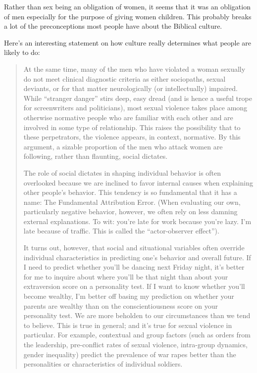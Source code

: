 \documentclass[11pt]{article}
\begin{document}
Rather than sex being an obligation of women, it seems that it was an obligation of men especially for the purpose of giving women children. This probably breaks a lot of the preconceptions most people have about the Biblical culture.

Here’s an interesting statement on how culture really determines what people are likely to do:
\begin{quote}
At the same time, many of the men who have violated a woman sexually do not meet clinical diagnostic criteria as either sociopaths, sexual deviants, or for that matter neurologically (or intellectually) impaired. While “stranger danger” stirs deep, easy dread (and is hence a useful trope for screenwriters and politicians), most sexual violence takes place among otherwise normative people who are familiar with each other and are involved in some type of relationship. This raises the possibility that to these perpetrators, the violence appears, in context, normative. By this argument, a sizable proportion of the men who attack women are following, rather than flaunting, social dictates.

The role of social dictates in shaping individual behavior is often overlooked because we are inclined to favor internal causes when explaining other people’s behavior. This tendency is so fundamental that it has a name: The Fundamental Attribution Error. (When evaluating our own, particularly negative behavior, however, we often rely on less damning external explanations. To wit: you’re late for work because you’re lazy. I’m late because of traffic. This is called the “actor-observer effect”).

It turns out, however, that social and situational variables often override individual characteristics in predicting one’s behavior and overall future. If I need to predict whether you’ll be dancing next Friday night, it’s better for me to inquire about where you’ll be that night than about your extraversion score on a personality test. If I want to know whether you’ll become wealthy, I’m better off basing my prediction on whether your parents are wealthy than on the conscientiousness score on your personality test. We are more beholden to our circumstances than we tend to believe. This is true in general; and it’s true for sexual violence in particular. For example, contextual and group factors (such as orders from the leadership, pre-conflict rates of sexual violence, intra-group dynamics, gender inequality) predict the prevalence of war rapes better than the personalities or characteristics of individual soldiers.


\end{quote}
\end{document}
